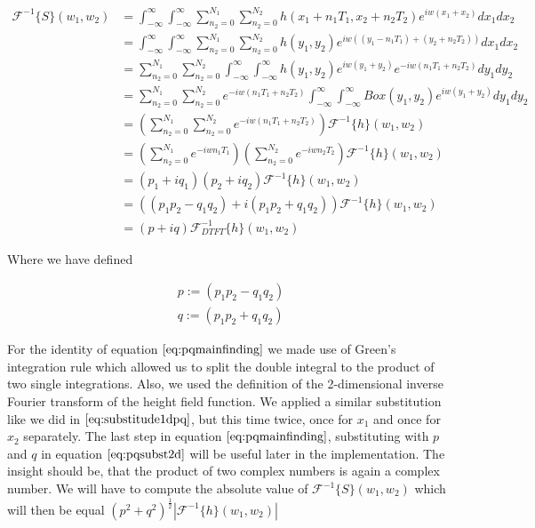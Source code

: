 \begin{align}
\mathcal{F}^{-1}\{S\}(w_1, w_2)
& = \int_{-\infty}^{\infty}\int_{-\infty}^{\infty} \sum_{n_2=0}^{N_1} \sum_{n_2=0}^{N_2} h(x_1 + n_1 T_1, x_2 + n_2 T_2) e^{iw(x_1 + x_2)}dx_1 dx_2 \nonumber \\
& = \int_{-\infty}^{\infty}\int_{-\infty}^{\infty} \sum_{n_2=0}^{N_1} \sum_{n_2=0}^{N_2} h(y_1, y_2) e^{iw((y_1 - n_1 T_1) + (y_2 + n_2 T_2))}dx_1 dx_2 \nonumber \\
& =\sum_{n_2=0}^{N_1} \sum_{n_2=0}^{N_2} \int_{-\infty}^{\infty}\int_{-\infty}^{\infty} h(y_1, y_2) e^{iw(y_1 + y_2)} e^{-iw(n_1 T_1 + n_2 T_2)}dy_1 dy_2 \nonumber \\
& =\sum_{n_2=0}^{N_1} \sum_{n_2=0}^{N_2} e^{-iw(n_1 T_1 + n_2 T_2)} \int_{-\infty}^{\infty}\int_{-\infty}^{\infty} Box(y_1, y_2) e^{iw(y_1 + y_2)} dy_1 dy_2 \nonumber \\
& =\left(\sum_{n_2=0}^{N_1} \sum_{n_2=0}^{N_2} e^{-iw(n_1 T_1 + n_2 T_2)}\right) \mathcal{F}^{-1}\{h\}(w_1,w_2) \nonumber \\
& =\left(\sum_{n_2=0}^{N_1} e^{-iw n_1 T_1}\right) \left(\sum_{n_2=0}^{N_2} e^{-iw n_2 T_2}\right) \mathcal{F}^{-1}\{h\}(w_1,w_2) \nonumber \\
& =(p_1 + i q_1)(p_2 + i q_2) \mathcal{F}^{-1}\{h\}(w_1,w_2) \nonumber \\
& =((p_1 p_2 - q_1 q_2) + i(p_1 p_2 + q_1 q_2)) \mathcal{F}^{-1}\{h\}(w_1,w_2) \nonumber \\
& =(p + iq) \mathcal{F}_{DTFT}^{-1}\{h\}(w_1,w_2)
\label{eq:pqmainfinding}
\end{align}

Where we have defined 

\begin{align}
p := (p_1 p_2 - q_1 q_2) \nonumber \\ 
q := (p_1 p_2 + q_1 q_2)
\label{eq:pqsubst2d}
\end{align}

For the identity of equation $\ref{eq:pqmainfinding}$ we made use of Green's integration rule which allowed us to split the double integral to the product of two single integrations. Also, we used the definition of the 2-dimensional inverse Fourier transform of the height field function. We applied a similar substitution like we did in $\ref{eq:substitude1dpq}$, but this time twice, once for $x_1$ and once for $x_2$ separately. The last step in equation $\ref{eq:pqmainfinding}$, substituting with $p$ and $q$ in equation $\ref{eq:pqsubst2d}$ will be useful later in the implementation. The insight should be, that the product of two complex numbers is again a complex number. We will have to compute the absolute value of $\mathcal{F}^{-1}\{S\}(w_1,w_2)$ which will then be equal $(p^2 + q^2)^{\frac{1}{2}}\left|\mathcal{F}^{-1}\{h\}(w_1,w_2)\right|$


